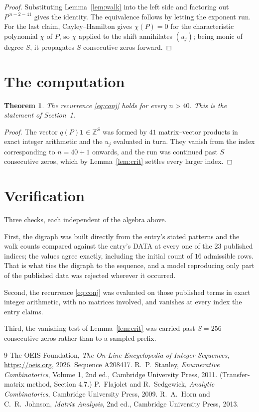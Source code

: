 \documentclass[11pt,a4paper]{article}
\theoremstyle{plain}
\newtheorem{theorem}{Theorem}
\theoremstyle{definition}
\begin{document}
\begin{proof}
Substituting Lemma~\ref{lem:walk} into the left side and factoring out
$P^{\,n-2-41}$ gives the identity. The equivalence follows by letting the exponent
run. For the last claim, Cayley--Hamilton gives $\chi(P)=0$ for the characteristic
polynomial $\chi$ of $P$, so $\chi$ applied to the shift annihilates $(u_j)$; being monic of
degree $S$, it propagates $S$ consecutive zeros forward.
\end{proof}

\section{The computation}

\begin{theorem}
The recurrence \eqref{eq:conj} holds for every $n>40$. This is the statement of
Section~1.
\end{theorem}

\begin{proof}
The vector $q(P)\mathbf{1}\in\mathbb{Z}^{S}$ was formed by $41$ matrix--vector
products in exact integer arithmetic and the $u_j$ evaluated in turn. They vanish from the
index corresponding to $n=40+1$ onwards, and the run was continued past $S$ consecutive
zeros, which by Lemma~\ref{lem:crit} settles every larger index.
\end{proof}

\section{Verification}

Three checks, each independent of the algebra above.

First, the digraph was built directly from the entry's stated patterns and the walk counts
compared against the entry's DATA at every one of the $23$ published indices; the
values agree exactly, including the initial count of $16$ admissible rows. That is
what ties the digraph to the sequence, and a model reproducing only part of the published
data was rejected wherever it occurred.

Second, the recurrence \eqref{eq:conj} was evaluated on those published terms in exact
integer arithmetic, with no matrices involved, and vanishes at every index the entry claims.

Third, the vanishing test of Lemma~\ref{lem:crit} was carried past $S=256$ consecutive
zeros rather than to a sampled prefix.

\begin{thebibliography}{9}
 The OEIS Foundation, \emph{The On-Line Encyclopedia of Integer
Sequences}, \url{https://oeis.org}, 2026. Sequence A208417.
 R.~P.~Stanley, \emph{Enumerative Combinatorics}, Volume 1, 2nd ed.,
Cambridge University Press, 2011. (Transfer-matrix method, Section 4.7.)
 P.~Flajolet and R.~Sedgewick, \emph{Analytic Combinatorics}, Cambridge
University Press, 2009.
 R.~A.~Horn and C.~R.~Johnson, \emph{Matrix Analysis}, 2nd ed., Cambridge
University Press, 2013.
\end{thebibliography}
\end{document}
